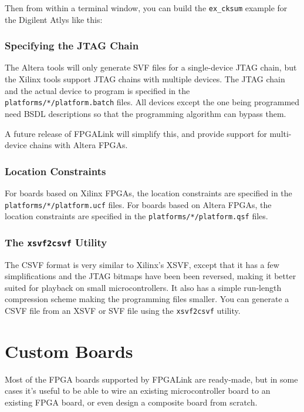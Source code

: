 Then from within a terminal window, you can build the \texttt{ex\_cksum} example for the Digilent Atlys like this:


\subsubsection{Specifying the JTAG Chain}
The Altera tools will only generate SVF files for a single-device JTAG chain, but the Xilinx tools support JTAG chains with multiple devices. The JTAG chain and the actual device to program is specified in the \texttt{platforms/*/platform.batch} files. All devices except the one being programmed need BSDL descriptions so that the programming algorithm can bypass them.

A future release of FPGALink will simplify this, and provide support for multi-device chains with Altera FPGAs.

\subsubsection{Location Constraints}
For boards based on Xilinx FPGAs, the location constraints are specified in the \texttt{platforms/*/platform.ucf} files. For boards based on Altera FPGAs, the location constraints are specified in the \texttt{platforms/*/platform.qsf} files.

\subsubsection{The \texttt{xsvf2csvf} Utility}
The CSVF format is very similar to Xilinx's XSVF, except that it has a few simplifications and the JTAG bitmaps have been been reversed, making it better suited for playback on small microcontrollers. It also has a simple run-length compression scheme making the programming files smaller. You can generate a CSVF file from an XSVF or SVF file using the \texttt{xsvf2csvf} utility.

\appendix
\newpage
\section{Custom Boards}
\label{apdx:custom}

Most of the FPGA boards supported by FPGALink are ready-made, but in some cases it's useful to be able to wire an existing microcontroller board to an existing FPGA board, or even design a composite board from scratch.

